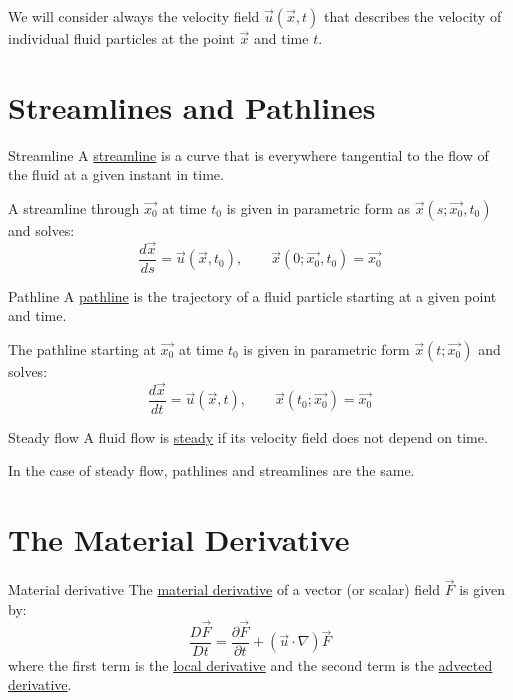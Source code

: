 \documentclass[../Main.tex]{subfiles}
\begin{document}
We will consider always the velocity field $\vec{u}(\vec{x}, t)$ that describes the velocity of individual fluid particles at the point $\vec{x}$ and time $t$.
\section{Streamlines and Pathlines}
\begin{definition}{Streamline}
    A \underline{streamline} is a curve that is everywhere tangential to the flow of the fluid at a given instant in time.
\end{definition}
A streamline through $\vec{x_0}$ at time $t_0$ is given in parametric form as $\vec{x}(s;\vec{x_0}, t_0)$ and solves:
\begin{equation*}
    \frac{d \vec{x}}{d s} = \vec{u}(\vec{x}, t_0),\qquad\vec{x}(0;\vec{x_0}, t_0) = \vec{x_0}
\end{equation*}
\begin{definition}{Pathline}
    A \underline{pathline} is the trajectory of a fluid particle starting at a given point and time.
\end{definition}
The pathline starting at $\vec{x_0}$ at time $t_0$ is given in parametric form $\vec{x}(t;\vec{x_0})$ and solves:
\begin{equation*}
    \frac{d\vec{x}}{dt} = \vec{u}(\vec{x}, t),\qquad\vec{x}(t_0;\vec{x_0}) = \vec{x_0}
\end{equation*}
\begin{definition}{Steady flow}
    A fluid flow is \underline{steady} if its velocity field does not depend on time.
\end{definition}
In the case of steady flow, pathlines and streamlines are the same.
\section{The Material Derivative}
\begin{definition}{Material derivative}
    The \underline{material derivative} of a vector (or scalar) field $\vec{F}$ is given by:
    \begin{equation*}
        \frac{D \vec{F}}{D t} = \frac{\partial \vec{F}}{\partial t} + (\vec{u} \cdot \nabla) \vec{F}
    \end{equation*}
    where the first term is the \underline{local derivative} and the second term is the \underline{advected derivative}.
\end{definition}
\end{document}
